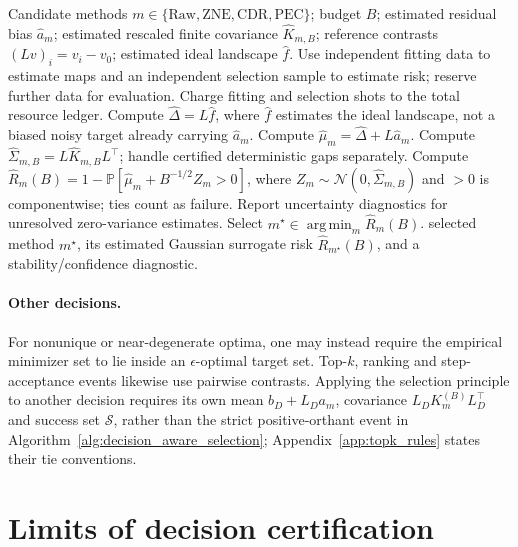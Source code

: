 \documentclass[a4paper,onecolumn,unpublished,nopdfoutputerror]{quantumarticle}
\theoremstyle{plain}
\theoremstyle{definition}
\newcommand{\Prob}{\mathbb{P}}
\newcommand{\calS}{\mathcal{S}}
\newcommand{\calN}{\mathcal{N}}
\newcommand{\Raw}{\mathrm{Raw}}
\newcommand{\ZNE}{\mathrm{ZNE}}
\newcommand{\CDR}{\mathrm{CDR}}
\newcommand{\PEC}{\mathrm{PEC}}
\newcommand{\argmin}{\operatorname*{arg\,min}}
\newcommand{\1}{\mathbf{1}}
\begin{document}
\begin{algorithm}[!ht]
\caption{QEM selection for strict argmin}
\label{alg:decision_aware_selection}
\begin{algorithmic}[1]
\Require Candidate methods $m\in\{\Raw,\ZNE,\CDR,\PEC\}$; budget $B$; estimated residual bias $\widehat a_m$; estimated rescaled finite covariance $\widehat K_{m,B}$; reference contrasts $(Lv)_i=v_i-v_0$; estimated ideal landscape $\widehat f$.
\State Use independent fitting data to estimate maps and an independent selection sample to estimate risk; reserve further data for evaluation.
\State Charge fitting and selection shots to the total resource ledger.
\State Compute $\widehat\Delta=L\widehat f$, where $\widehat f$ estimates the ideal landscape, not a biased noisy target already carrying $\widehat a_m$.
    \State Compute $\widehat\mu_m=\widehat\Delta+L\widehat a_m$.
    \State Compute $\widehat\Sigma_{m,B}=L\widehat K_{m,B}L^\top$; handle certified deterministic gaps separately.
    \State Compute $\widehat R_m(B)=1-\Prob[\widehat\mu_m+B^{-1/2}Z_m>0]$, where $Z_m\sim\calN(0,\widehat\Sigma_{m,B})$ and $>0$ is componentwise; ties count as failure.
    \State Report uncertainty diagnostics for unresolved zero-variance estimates.
\EndFor
\State Select $m^\star\in\argmin_m \widehat R_m(B)$.
\State \Return selected method $m^\star$, its estimated Gaussian surrogate risk $\widehat R_{m^\star}(B)$, and a stability/confidence diagnostic.
\end{algorithmic}
\end{algorithm}


\paragraph{Other decisions.}
For nonunique or near-degenerate optima, one may instead require the empirical minimizer set to lie inside an $\epsilon$-optimal target set. Top-$k$, ranking and step-acceptance events likewise use pairwise contrasts. Applying the selection principle to another decision requires its own mean $b_D+L_Da_m$, covariance $L_DK_m^{(B)}L_D^\top$ and success set $\calS$, rather than the strict positive-orthant event in Algorithm~\ref{alg:decision_aware_selection}; Appendix~\ref{app:topk_rules} states their tie conventions.

\section{Limits of decision certification}
\label{sec:decision_limits}
\end{document}
